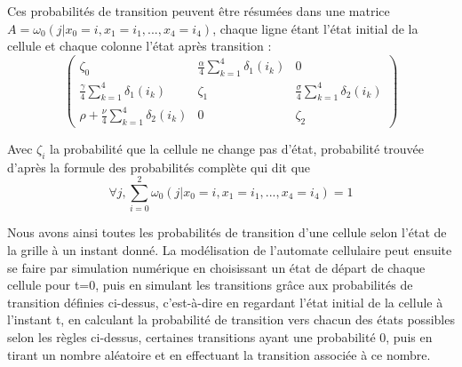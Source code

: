 Ces probabilités de transition peuvent être résumées dans une matrice $A=\omega_0(j|x_0=i, x_1=i_1, ..., x_4=i_4)$, chaque ligne étant l'état initial de la cellule et chaque colonne l'état après transition : 
\begin{equation}
    \begin{pmatrix}
        \zeta_0 & \frac{\alpha}{4}\sum_{k=1}^{4}\delta_{1}(i_k) & 0 \\
        \frac{\gamma}{4}\sum_{k=1}^{4}\delta_{1}(i_k) & \zeta_1 & \frac{\sigma}{4}\sum_{k=1}^{4}\delta_{2}(i_k) \\
        \rho + \frac{\nu}{4}\sum_{k=1}^{4}\delta_{2}(i_k) & 0 & \zeta_2
    \end{pmatrix}
\end{equation}


Avec $\zeta_i$ la probabilité que la cellule ne change pas d'état, probabilité trouvée d'après la formule des probabilités complète qui dit que \begin{equation}
\forall j, \sum_{i=0}^2\omega_0(j|x_0=i, x_1=i_1, ..., x_4=i_4)=1\end{equation}

Nous avons ainsi toutes les probabilités de transition d'une cellule selon l'état de la grille à un instant donné. La modélisation de l'automate cellulaire peut ensuite se faire par simulation numérique en choisissant un état de départ de chaque cellule pour t=0, puis en simulant les transitions grâce aux probabilités de transition définies ci-dessus, c'est-à-dire en regardant l'état initial de la cellule à l'instant t, en calculant la probabilité de transition vers chacun des états possibles selon les règles ci-dessus, certaines transitions ayant une probabilité 0, puis en tirant un nombre aléatoire et en effectuant la transition associée à ce nombre. 
